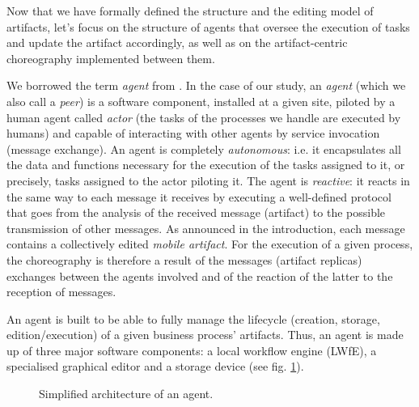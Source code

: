 \label{chap3:sec:agents-and-choreography}

Now that we have formally defined the structure and the editing model of artifacts, let's focus on the structure of agents that oversee the execution of tasks and update the artifact accordingly, as well as on the artifact-centric choreography implemented between them. 

\label{chap3:sec:agent-definition}
We borrowed the term \textit{agent} from \cite{lohmann2010artifact}. In the case of our study, an \textit{agent} (which we also call a \textit{peer}) is a software component, installed at a given site, piloted by a human agent called \textit{actor} (the tasks of the processes we handle are executed by humans) and capable of interacting with other agents by service invocation (message exchange). An agent is completely \textit{autonomous}: i.e. it encapsulates all the data and functions necessary for the execution of the tasks assigned to it, or precisely, tasks assigned to the actor piloting it. The agent is \textit{reactive}: it reacts in the same way to each message it receives by executing a well-defined protocol that goes from the analysis of the received message (artifact) to the possible transmission of other messages. As announced in the introduction, each message contains a collectively edited \textit{mobile artifact}. For the execution of a given process, the choreography is therefore a result of the messages (artifact replicas) exchanges between the agents involved and of the reaction of the latter to the reception of messages.

\label{chap3:sec:agent-structure}

An agent is built to be able to fully manage the lifecycle (creation, storage, edition/execution) of a given business process' artifacts. Thus, an agent is made up of three major software components: a local workflow engine (LWfE), a specialised graphical editor and a storage device (see fig. \ref{chap3:fig:simplify-architecture-peer}).
\begin{figure}[ht!]
	\noindent
	\caption{Simplified architecture of an agent.}
	\label{chap3:fig:simplify-architecture-peer}
\end{figure}


\label{chap3:sec:the-local-workflow-engine}

